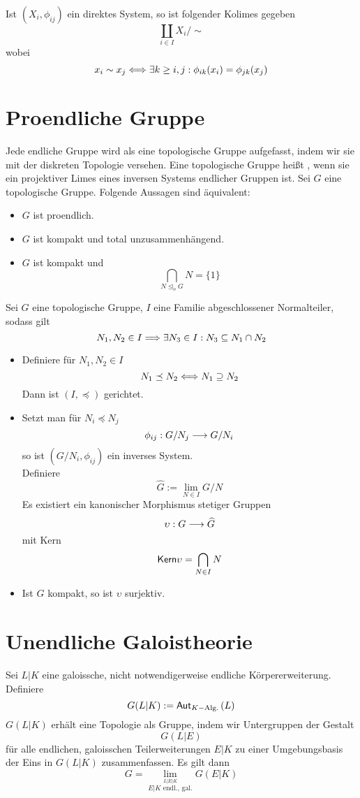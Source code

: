 \documentclass{book}
\begin{document}
\Bem{}
Ist $(X_i,\phi_{ij})$ ein direktes System, so ist folgender Kolimes gegeben
\[ \coprod_{i\in I}X_i/\sim \]
wobei
\[ x_i \sim x_j \overset{}{\Longleftrightarrow} \exists k \geq i,j : \phi_{ik}(x_i) = \phi_{jk}(x_j) \]

\section{Proendliche Gruppe}
\Bem{}
Jede endliche Gruppe wird als eine topologische Gruppe aufgefasst, indem wir sie mit der diskreten Topologie versehen.
\Def{}
Eine topologische Gruppe heißt , wenn sie ein projektiver Limes eines inversen Systems endlicher Gruppen ist.
\Satz{}
Sei $G$ eine topologische Gruppe. Folgende Aussagen sind äquivalent:
\begin{itemize}
	\item $G$ ist proendlich.
	\item $G$ ist kompakt und total unzusammenhängend.
	\item $G$ ist kompakt und
	\[ \bigcap_{N\trianglelefteq_o G}N = \{1\} \]
\end{itemize}

\Lem{}
Sei $G$ eine topologische Gruppe, $I$ eine Familie abgeschlossener Normalteiler, sodass gilt
\[ N_1,N_2 \in I \overset{}{\Longrightarrow} \exists N_3 \in I: N_3 \subseteq N_1 \cap N_2 \]
\begin{itemize}
	\item Definiere für $N_1,N_2\in I$
	\[ N_1\preceq N_2 \overset{}{\Longleftrightarrow} N_1 \supseteq N_2 \]
	Dann ist $(I,\preceq)$ gerichtet.
	\item Setzt man für $N_i \preceq N_j$
	\[ \phi_{ij} : G/N_j \overset{}{\longrightarrow} G/N_i \]
	so ist $(G/N_i, \phi_{ij})$ ein inverses System.\\
	Definiere
	\[ \widehat{G} := \lim\limits_{N \in I}G/N \]
	Es existiert ein kanonischer Morphismus stetiger Gruppen
	\[ \upsilon : G \overset{}{\longrightarrow} \widehat{G} \]
	mit Kern
	\[\textsf{Kern} \upsilon = \bigcap_{N\in I}N \]
	\item Ist $G$ kompakt, so ist $\upsilon$ surjektiv.
\end{itemize}

\section{Unendliche Galoistheorie}

\Satz{}
Sei $L|K$ eine galoissche, nicht notwendigerweise endliche Körpererweiterung. Definiere
\[ G(L|K) :=\textsf{Aut}_{K-\text{Alg.}}\left(L\right) \]
$G(L|K)$ erhält eine Topologie als Gruppe, indem wir Untergruppen der Gestalt
\[ G(L|E) \]
für alle endlichen, galoisschen Teilerweiterungen $E|K$ zu einer Umgebungsbasis der Eins in $G(L|K)$ zusammenfassen. Es gilt dann
\[ G = \lim\limits_{\stackrel{L|E|K}{E|K \text{ endl., gal.}}}G(E|K) \]
\end{document}
